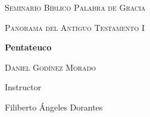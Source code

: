 
%


\begin{titlepage}
	\begin{center}
		\vspace*{1cm}

		{\scshape\LARGE Seminario Bíblico Palabra de Gracia \par}
		\vspace{1cm}
		{\scshape\Large Panorama del Antiguo Testamento I \par}
		\vspace{1.5cm}
		{\huge\bfseries Pentateuco \par}
		\vspace{2cm}
		{\Large\scshape Daniel Godínez Morado \par}
		\vfill
		Instructor\par
		Filiberto Ángeles Dorantes
		\vfill

		{\large {}}
	\end{center}

\end{titlepage}
%


